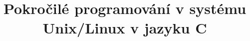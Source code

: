 

\title[Pokročilé programování Unix/Linux]{Pokročilé programování v systému Unix/Linux v jazyku C}
